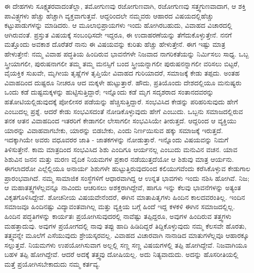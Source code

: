 ಈ ದೇಹಗಳು ಸೂಕ್ಷ್ಮತರವಾದಂತೆಲ್ಲಾ, ತಮೋಗುಣವು ರಜೋಗುಣವಾಗಿ, ರಜೋಗುಣವು ಸತ್ತ್ವಗುಣವಾದಾಗ, ಆ ಶಕ್ತಿ ಪಾವಿತ್ರ್ಯಗಳು ಹೆಚ್ಚು ಹೆಚ್ಚಾಗಿ ವ್ಯಕ್ತವಾಗುತ್ತವೆ. ಆದ್ದರಿಂದಲೇ ನಮ್ಮವರು ಆಹಾರದ ವಿಷಯದಲ್ಲಿ\break ಹೆಚ್ಚು ಕಟ್ಟುಪಾಡುಗಳನ್ನು ಮಾಡಿದರು. ಆ ಮೂಲಾಭಿಪ್ರಾಯಗಳು ಇಂದು ಹೋಗಿರಬಹುದು, ವಿವಾಹದ ವಿಚಾರದಲ್ಲಿ ಆಗಿರುವಂತೆ. ಪ್ರಸ್ತುತ ವಿಷಯಕ್ಕೆ ಸಂಬಂಧಿಸದೇ ಇದ್ದರೂ, ಈ ಉದಾಹರಣೆಯನ್ನು ತೆಗೆದುಕೊಳ್ಳುತ್ತೇನೆ. ನನಗೆ ಮತ್ತೊಂದು ಅವಕಾಶ ದೊರೆತರೆ ನಾನು ಈ ವಿಷಯವನ್ನು ಕುರಿತು ಹೆಚ್ಚು ಹೇಳುತ್ತೇನೆ. ಈಗ ಇಷ್ಟು ಮಾತ್ರ ಹೇಳುತ್ತೇನೆ: ನಮ್ಮ ವಿವಾಹ ಪದ್ಧತಿಯ ಹಿಂದಿರುವ ಭಾವನೆಗಳೇ ನಿಜವಾದ ನಾಗರಿಕತೆಯನ್ನು ನಿರ್ಮಿಸಲು ಸಾಧ್ಯ. ಒಬ್ಬ ಸ್ತ್ರೀಯಾಗಲೀ, ಪುರುಷನಾಗಲೀ ತಮ್ಮ ತಮ್ಮ ಮನಸ್ಸಿಗೆ ಬಂದ ಸ್ತ್ರೀಯನ್ನಾಗಲೀ ಪುರುಷನನ್ನಾಗಲೀ ವರಿಸಲು ಬಿಟ್ಟರೆ, ವೈಯಕ್ತಿಕ ಸುಖವೇ, ಮೃಗೀಯ ತೃಷ್ಣೆಗಳ ತೃಪ್ತಿಯೇ ವಿವಾಹದ ಗುರಿಯಾದರೆ, ಸಮಾಜಕ್ಕೆ ಕೇಡು ತಪ್ಪದು. ಅಂತಹ ವಿವಾಹದಿಂದ ದುಷ್ಟರೂ ನೀಚರೂ ಆದ ಮಕ್ಕಳೇ ಹುಟ್ಟುತ್ತಾರೆ. ಹೌದು, ಪ್ರತಿಯೊಂದು ದೇಶದಲ್ಲಿಯೂ ಮನುಷ್ಯರು ಒಂದು ಕಡೆ ದುಷ್ಟಮಕ್ಕಳನ್ನು ಹುಟ್ಟಿಸುತ್ತಿದ್ದಾರೆ; ಇನ್ನೊಂದು ಕಡೆ ಮೃಗ ಸದೃಶರಾದ ಸಂತಾನದವರನ್ನು ಹತೋಟಿಯಲ್ಲಿಡುವುದಕ್ಕೆ ಪೋಲೀಸರ ಪಡೆಯನ್ನು ಹೆಚ್ಚಿಸುತ್ತಿದ್ದಾರೆ. ಸಂಭವಿಸಿದ ಕೇಡನ್ನು ಪರಿಹರಿಸುವುದು ಹೇಗೆ ಎಂಬುದಲ್ಲ ಪ್ರಶ್ನೆ. ಆದರೆ ಕೇಡು ಸಂಭವಿಸದಂತೆ ನೋಡಿಕೊಳ್ಳುವುದು ಹೇಗೆ ಎಂಬುದು. ಒಬ್ಬನು ಸಮಾಜದಲ್ಲಿರುವ ತನಕ ಆತನ ವಿವಾಹದಿಂದ ಇತರರಿಗೆ ಕೇಡಾಗಲೀ ಲೇಸಾಗಲೀ ಸಂಭವಿಸಿಯೇ ತೀರುತ್ತದೆ. ಆದ್ದರಿಂದ ಆ ವ್ಯಕ್ತಿಯು ಯಾರನ್ನು ವಿವಾಹವಾಗಬೇಕು, ಯಾರನ್ನು ಬಿಡಬೇಕು, ಎಂದು ನಿರ್ಣಯಿಸುವ ಹಕ್ಕು ಸಮಾಜಕ್ಕೆ ಇರುತ್ತದೆ. ಇದಕ್ಕಾಗಿಯೇ ಅವರು ವಧೂವರರ ಜಾತಿ - ಜಾತಕಗಳನ್ನು ನೋಡುತ್ತಾರೆ. ಇನ್ನೊಂದು ವಿಷಯವನ್ನು ನಿಮಗೆ ತಿಳಿಸುತ್ತೇನೆ. ಕಾಮ ಮಾತ್ರದಿಂದ ಸಂಭವಿಸಿದ ಶಿಶು ಎಂದಿಗೂ ಆರ್ಯನಲ್ಲ ಎಂಬುದು ಮನುವಿನ ವಚನ. ಯಾವ ಶಿಶುವಿನ ಜನನ ಮತ್ತು ಮರಣ ವೈದಿಕ ನಿಯಮಗಳ ಪ್ರಕಾರ ನಡೆಯುತ್ತದೆಯೋ ಆ ಶಿಶುವು ಮಾತ್ರ ಆರ್ಯನು. ಈಗಲಾದರೋ ಎಲ್ಲೆಲ್ಲಿಯೂ ಅನಾರ್ಯ ಶಿಶುಗಳೇ ಹುಟ್ಟುತ್ತಿರುವುದರಿಂದ ಕಲಿಯುಗವೆಂದು ಕರೆಸಿಕೊಳ್ಳುವ ಕೇಡುಗಾಲ ಪ್ರಾರಂಭವಾಗಿದೆ. ನಮ್ಮ ಸಾಮಾಜಿಕ ಸಂಸ್ಥೆಗಳಿಗೆ ಆಧಾರವಾಗಿದ್ದ ಆ ಉನ್ನತ ಭಾವಗಳು ಇಂದು ನಶಿಸಿ ಹೋಗಿವೆ. ನಿಜ; ಆ ಮಹಾತತ್ತ್ವಗಳೆಲ್ಲವನ್ನೂ ನಾವಿಂದು ಆಚರಿಸಲು ಅಶಕ್ತರಾಗಿದ್ದೇವೆ, ಹಾಗೂ ಇನ್ನು ಕೆಲವು ಭಾವನೆಗಳನ್ನು ಅತ್ಯಂತ ವಿಕೃತಗೊಳಿಸಿದ್ದೇವೆ. ಶೋಚನೀಯ ವಿಷಯವೇನೆಂದರೆ, ಈಗಿನ ಮಾತಾಪಿತೃಗಳು ಹಿಂದಿನ ಕಾಲದವರಂತಿಲ್ಲ. ಇಂದಿನ ಸಮಾಜವೂ ಹಿಂದಿನಷ್ಟು ವಿದ್ಯಾವಂತವಾಗಿಲ್ಲ ಮತ್ತು ವ್ಯಕ್ತಿಯ ಬಗ್ಗೆ ಹಿಂದೆ ಇದ್ದ ಕಳಕಳಿ ಈಗಿನ ಸಮಾಜದಲ್ಲಿಲ್ಲ. ಹಿಂದಿನ ಪದ್ಧತಿಗಳನ್ನು ಕಾರ್ಯತಃ ಪ್ರಯೋಗಿಸುವುದರಲ್ಲಿ ನಾವೆಷ್ಟು ತಪ್ಪಿದ್ದರೂ, ಅವುಗಳ ಹಿಂದಿರುವ ತತ್ತ್ವಗಳು ಮಹತ್ತಾದುವು. ಅವುಗಳ ಪ್ರಯೋಗದಲ್ಲಿ ನಾವು ತಪ್ಪು ಹಾದಿ ಹಿಡಿದಿದ್ದರೆ ತಿದ್ದಿಕೊಳ್ಳುವುದು ನಮ್ಮ ಕೆಲಸವೇ ಹೊರತು, ತತ್ತ್ವವನ್ನೇ ಮೂಲೆಗೆ ಎಸೆಯುವುದು ಶ್ರೇಯಸ್ಕರವಲ್ಲ. ವಿವಾಹದ ವಿಚಾರವಾಗಿ ನಾನಾಡಿದ ಮಾತುಗಳೆಲ್ಲವೂ ಆಹಾರಕ್ಕೂ ಸಲ್ಲುತ್ತವೆ. ನಿಯಮಗಳು ಉಪಯೋಗಿಸುವಾಗ ಅಲ್ಲಲ್ಲಿ ಸಣ್ಣ ಸಣ್ಣ ವಿಷಯಗಳಲ್ಲಿ ತಪ್ಪಿ ಹೋಗಿದ್ದೇವೆ. ನಿಜವಾಗಿಯೂ ಬಹಳ ತಪ್ಪಿ ಹೋಗಿದ್ದೇವೆ. ಆದರೆ ಅದಕ್ಕೆ ತತ್ತ್ವವು ದೋಷಿಯಲ್ಲ. ಅದು ನಿತ್ಯವಾದುದು. ಅದನ್ನು ಹೊಸರೀತಿಯಲ್ಲಿ ಮತ್ತೆ ಪ್ರಯೋಗಿಸಬೇಕಾದುದು ನಮ್ಮ ಕರ್ತವ್ಯ.

